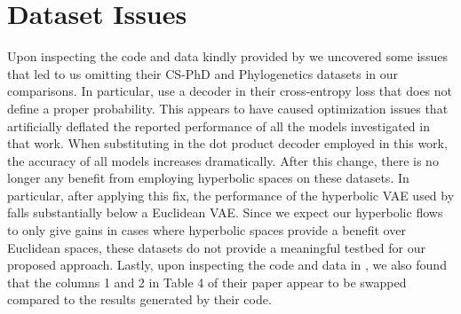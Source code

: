\section{Dataset Issues}
\label{dataset_issues}
Upon inspecting the code and data kindly provided by \citet{mathieu2019continuous} we uncovered some issues that led to us omitting their CS-PhD and Phylogenetics datasets in our comparisons. 
In particular, \citet{mathieu2019continuous} use a decoder in their cross-entropy loss that does not define a proper probability. 
This appears to have caused optimization issues that artificially deflated the reported performance of all the models investigated in that work.
When substituting in the dot product decoder employed in this work, the accuracy of all models increases dramatically. 
After this change, there is no longer any benefit from employing hyperbolic spaces on these datasets. 
In particular, after applying this fix, the performance of the hyperbolic VAE used by \citet{mathieu2019continuous} falls substantially below a Euclidean VAE.
Since we expect our hyperbolic flows to only give gains in cases where hyperbolic spaces provide a benefit over Euclidean spaces, these datasets do not provide a meaningful testbed for our proposed approach. 
Lastly, upon inspecting the code and data in \citet{mathieu2019continuous}, we also found that the columns 1 and 2 in Table 4 of their paper appear to be swapped compared to the results generated by their code. 